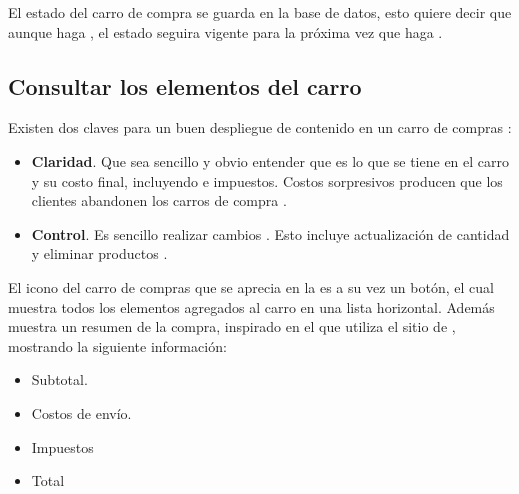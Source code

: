 		El estado del carro de compra se guarda en la base de datos, esto quiere decir que aunque haga \logoutCPT, el estado seguira vigente para la próxima vez que haga \loginUpperCPT.


	\subsection{Consultar los elementos del carro}\label{chapter:section:carro_compra:subsection:request}



		Existen dos claves para un buen despliegue de contenido en un carro de compras \cite{online_official_conversionxl_checkout_flow}:
		\begin{itemize}
			\item
				\textbf{Claridad}. Que sea sencillo y obvio entender que es lo que se tiene en el carro y su costo final, incluyendo \shipping e impuestos. Costos sorpresivos producen que los clientes abandonen los carros de compra \cite{online_official_conversionxl_checkout_flow}.
			\item
				\textbf{Control}. Es sencillo realizar cambios \cite{online_official_conversionxl_checkout_flow}. Esto incluye actualización de cantidad y eliminar productos \cite{online_official_conversionxl_shopping_cart_abandonment}.
		\end{itemize}

		El icono del carro de compras que se aprecia en la  es a su vez un botón, el cual muestra todos los elementos agregados al carro en una lista horizontal. Además muestra un resumen de la compra, inspirado en el que utiliza el sitio de \shopifyNAME {}, mostrando la siguiente información: 
		\begin{itemize}
			\item
				Subtotal.
			\item
				Costos de envío.
			\item
				Impuestos
			\item
				Total
		\end{itemize}

